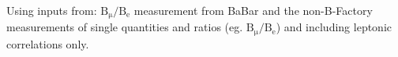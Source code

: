 \noindent Using inputs from: $\mathrm{B_\mu/B_e}$ measurement from BaBar and the non-B-Factory measurements of single quantities and ratios (eg. $\mathrm{B_\mu/B_e}$) and including leptonic correlations only.
